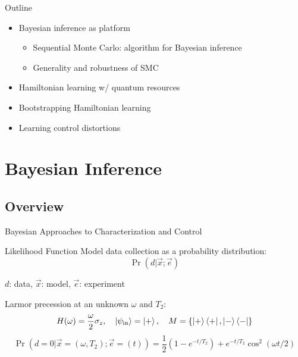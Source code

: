 \documentclass[xcolor=dvipsnames, compress]{beamer}
\begin{document}
\begin{frame}{Outline}

  \begin{itemize}[<+->]
    \item Bayesian inference as platform
    \begin{itemize}
      \item Sequential Monte Carlo: algorithm for Bayesian inference
      \item Generality and robustness of SMC
    \end{itemize}
    \item Hamiltonian learning w/ quantum resources
    \item Bootstrapping Hamiltonian learning
    \item Learning control distortions
  \end{itemize}

\end{frame}

\section[Bayes]{Bayesian Inference}
\subsection{Overview}

\begin{frame}{Bayesian Approaches to Characterization and Control}

  \begin{block}{Likelihood Function}
  Model data collection as a probability distribution:
    $$\Pr(d | \vec{x}; \vec{e})$$
    \begin{center}
      $d$: data, \quad $\vec{x}$: model, \quad $\vec{e}$: experiment
    \end{center}
  \end{block}

  \pause
  
  \begin{example}
    Larmor precession at an unknown $\omega$ and $T_2$:
    \begin{equation*}
      H(\omega) = \frac{\omega}{2} \sigma_z,\quad\ket{\psi_\text{in}} = \ket{+},\quad M = \{\ket{+}\bra{+}, \ket{-}\bra{-}\}
    \end{equation*}
    \begin{equation*}
      \Pr(d = 0 | \vec{x} = (\omega, T_2); \vec{e} = (t)) = \frac{1}{2}(1 - e^{-t / T_2}) + e^{-t / T_2} \cos^2(\omega t / 2)
    \end{equation*}

  \end{example}

\end{frame}
\end{document}
